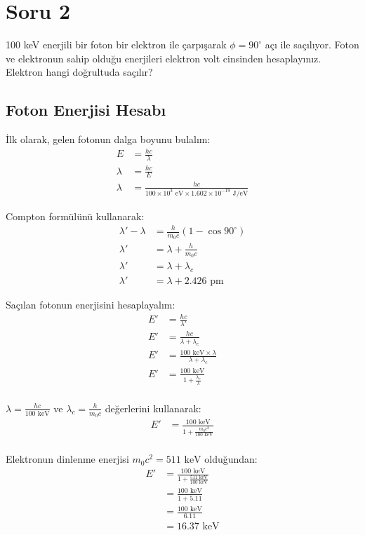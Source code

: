 \documentclass[11pt,letterpaper]{fenbil}
\begin{document}
\section{Soru 2}

100 keV enerjili bir foton bir elektron ile çarpışarak $\phi = 90^\circ$ açı ile saçılıyor. Foton ve elektronun sahip olduğu enerjileri elektron volt cinsinden hesaplayınız. Elektron hangi doğrultuda saçılır?

\subsection{Foton Enerjisi Hesabı}

İlk olarak, gelen fotonun dalga boyunu bulalım:
\begin{align}
E &= \frac{hc}{\lambda} \\
\lambda &= \frac{hc}{E} \\
\lambda &= \frac{hc}{100 \times 10^3 \text{ eV} \times 1.602 \times 10^{-19} \text{ J/eV}}
\end{align}

Compton formülünü kullanarak:
\begin{align}
\lambda' - \lambda &= \frac{h}{m_0c}(1 - \cos 90^\circ) \\
\lambda' &= \lambda + \frac{h}{m_0c} \\
\lambda' &= \lambda + \lambda_c \\
\lambda' &= \lambda + 2.426 \text{ pm}
\end{align}

Saçılan fotonun enerjisini hesaplayalım:
\begin{align}
E' &= \frac{hc}{\lambda'} \\
E' &= \frac{hc}{\lambda + \lambda_c} \\
E' &= \frac{100 \text{ keV} \times \lambda}{\lambda + \lambda_c} \\
E' &= \frac{100 \text{ keV}}{1 + \frac{\lambda_c}{\lambda}} \\
\end{align}

$\lambda = \frac{hc}{100 \text{ keV}}$ ve $\lambda_c = \frac{h}{m_0c}$ değerlerini kullanarak:
\begin{align}
E' &= \frac{100 \text{ keV}}{1 + \frac{m_0c^2}{100 \text{ keV}}} \\
\end{align}

Elektronun dinlenme enerjisi $m_0c^2 = 511 \text{ keV}$ olduğundan:
\begin{align}
E' &= \frac{100 \text{ keV}}{1 + \frac{511 \text{ keV}}{100 \text{ keV}}} \\
&= \frac{100 \text{ keV}}{1 + 5.11} \\
&= \frac{100 \text{ keV}}{6.11} \\
&= 16.37 \text{ keV}
\end{align}
\end{document}
